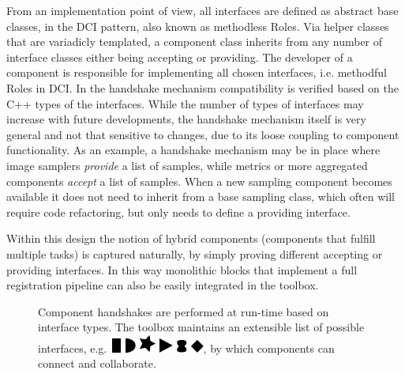 From an implementation point of view, all interfaces are defined as
abstract base classes, in the DCI pattern, also known as methodless
Roles. Via helper classes that are variadicly templated, a component
class inherits from any number of interface classes either being
accepting or providing. The developer of a component is responsible
for implementing all chosen interfaces, i.e. methodful Roles in DCI.
In the handshake mechanism compatibility is verified based on the
C++ types of the interfaces. While the number of types of interfaces
may increase with future developments, the handshake mechanism
itself is very general and not that sensitive to changes, due to its
loose coupling to component functionality. As an example, a
handshake mechanism may be in place where image samplers
\emph{provide} a list of samples, while metrics or more aggregated
components \emph{accept} a list of samples. When a new sampling
component becomes available it does not need to inherit from a base
sampling class, which often will require code refactoring, but only
needs to define a providing interface.

Within this design the notion of hybrid components (components that
fulfill multiple tasks) is captured naturally, by simply proving
different accepting or providing interfaces. In this way monolithic
blocks that implement a full registration pipeline can also be
easily integrated in the toolbox.

\begin{figure}
\centering
 \scalebox{1.0}{
  
 }
\caption{Component handshakes are performed at run-time based on
interface types. The toolbox maintains an extensible list of
possible interfaces,
e.g.~\protect\includegraphics[height=1.2ex]{IFrect.pdf}
\protect\includegraphics[height=1.2ex]{IFmoon.pdf}
\protect\includegraphics[height=1.2ex]{IFstar.pdf}
\protect\includegraphics[height=1.2ex]{IFtriangle.pdf}
\protect\includegraphics[height=1.2ex]{IFbarbapappa.pdf}
\protect\includegraphics[height=1.2ex]{IFsquare.pdf},
by which components can connect and collaborate.}
\label{fig:interface}
\end{figure}

